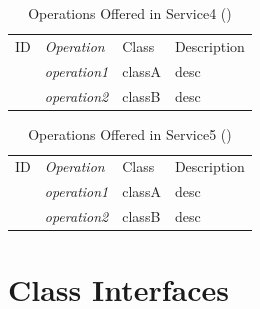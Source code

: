 \documentclass[12pt,letterpaper]{article}
\begin{document}
\begin{table}[H]
\caption{Operations Offered in Service4 ()} 
\begin{tabu} to 
	\tableheader{}ID & Operation & Class & Description\\
	 & operation1 & classA & desc\\
	 & operation2 & classB & desc\\
\end{tabu}
\end{table}

\begin{table}[H]
\caption{Operations Offered in Service5 ()} 
\begin{tabu} to 
	\tableheader{}ID & Operation & Class & Description\\
	 & operation1 & classA & desc\\
	 & operation2 & classB & desc\\
\end{tabu}
\end{table}

\section{Class Interfaces}
\end{document}

